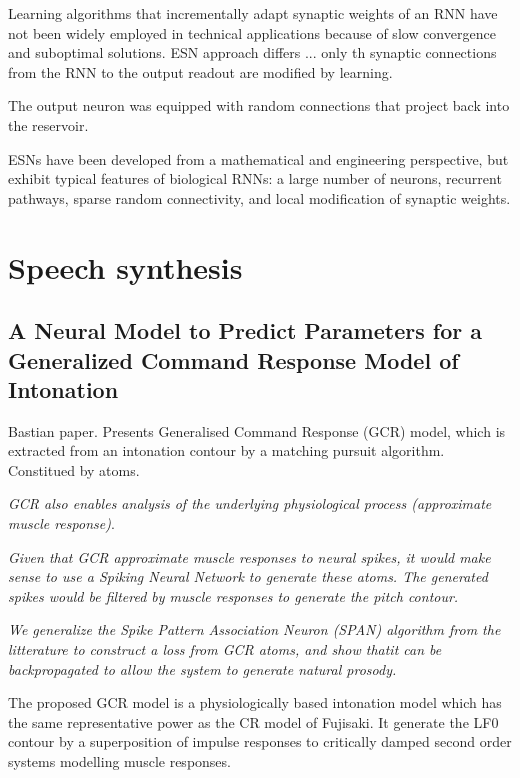\documentclass[12pt]{article}
\begin{document}
Learning algorithms that incrementally adapt synaptic weights of an RNN have not been widely employed in technical applications because of slow convergence and suboptimal solutions. ESN approach differs ... only th synaptic connections from the RNN to the output readout are modified by learning.

The output neuron was equipped with random connections that project back into the reservoir.

ESNs have been developed from a mathematical and engineering perspective, but exhibit typical features of biological RNNs: a large number of neurons, recurrent pathways, sparse random connectivity, and local modification of synaptic weights.

\section{Speech synthesis}

\subsection{A Neural Model to Predict Parameters for a Generalized Command Response Model of Intonation \cite{schnell2018neural}}

Bastian paper. Presents Generalised Command Response (GCR) model, which is extracted from an intonation contour by a matching pursuit algorithm. Constitued by atoms. 

\textit{GCR also enables analysis of the underlying physiological process (approximate muscle response)}.

\textit{Given that GCR approximate muscle responses to neural spikes, it would make sense to use a Spiking Neural Network to generate these atoms. The generated spikes would be filtered by muscle responses to generate the pitch contour.}

\textit{We generalize  the Spike Pattern Association Neuron (SPAN) algorithm from the litterature to construct a loss from GCR atoms, and show thatit can be backpropagated to allow the system to generate natural prosody.}

The proposed GCR model is a physiologically based intonation model which has the same representative power as the CR model of Fujisaki. It generate the LF0 contour by a superposition of impulse responses to critically damped second order systems modelling muscle responses.
\end{document}
